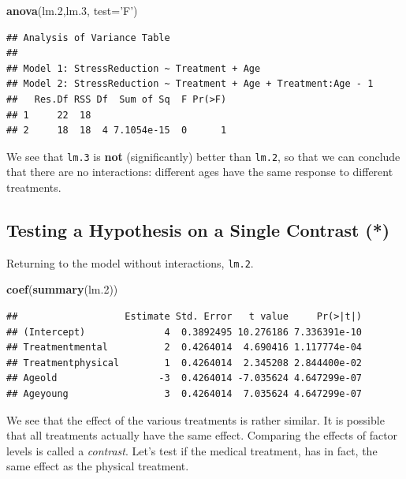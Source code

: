 \documentclass[]{book}
\newenvironment{Shaded}{\begin{snugshade}}{\end{snugshade}}
\newcommand{\DataTypeTok}[1]{\textcolor[rgb]{0.13,0.29,0.53}{#1}}
\newcommand{\FloatTok}[1]{\textcolor[rgb]{0.00,0.00,0.81}{#1}}
\newcommand{\KeywordTok}[1]{\textcolor[rgb]{0.13,0.29,0.53}{\textbf{#1}}}
\newcommand{\NormalTok}[1]{#1}
\newcommand{\StringTok}[1]{\textcolor[rgb]{0.31,0.60,0.02}{#1}}
\theoremstyle{definition}
\theoremstyle{definition}
\theoremstyle{definition}
\theoremstyle{remark}
\begin{document}
\begin{Shaded}
\begin{Highlighting}[]
\KeywordTok{anova}\NormalTok{(lm}\FloatTok{.2}\NormalTok{,lm}\FloatTok{.3}\NormalTok{, }\DataTypeTok{test=}\StringTok{'F'}\NormalTok{)}
\end{Highlighting}
\end{Shaded}

\begin{verbatim}
## Analysis of Variance Table
## 
## Model 1: StressReduction ~ Treatment + Age
## Model 2: StressReduction ~ Treatment + Age + Treatment:Age - 1
##   Res.Df RSS Df  Sum of Sq  F Pr(>F)
## 1     22  18                        
## 2     18  18  4 7.1054e-15  0      1
\end{verbatim}

We see that \texttt{lm.3} is \textbf{not} (significantly) better than \texttt{lm.2}, so that we can conclude that there are no interactions: different ages have the same response to different treatments.

\hypertarget{testing-a-hypothesis-on-a-single-contrast}{%
\subsection{Testing a Hypothesis on a Single Contrast (*)}\label{testing-a-hypothesis-on-a-single-contrast}}

Returning to the model without interactions, \texttt{lm.2}.

\begin{Shaded}
\begin{Highlighting}[]
\KeywordTok{coef}\NormalTok{(}\KeywordTok{summary}\NormalTok{(lm}\FloatTok{.2}\NormalTok{))}
\end{Highlighting}
\end{Shaded}

\begin{verbatim}
##                   Estimate Std. Error   t value     Pr(>|t|)
## (Intercept)              4  0.3892495 10.276186 7.336391e-10
## Treatmentmental          2  0.4264014  4.690416 1.117774e-04
## Treatmentphysical        1  0.4264014  2.345208 2.844400e-02
## Ageold                  -3  0.4264014 -7.035624 4.647299e-07
## Ageyoung                 3  0.4264014  7.035624 4.647299e-07
\end{verbatim}

We see that the effect of the various treatments is rather similar.
It is possible that all treatments actually have the same effect.
Comparing the effects of factor levels is called a \emph{contrast}.
Let's test if the medical treatment, has in fact, the same effect as the physical treatment.
\end{document}
